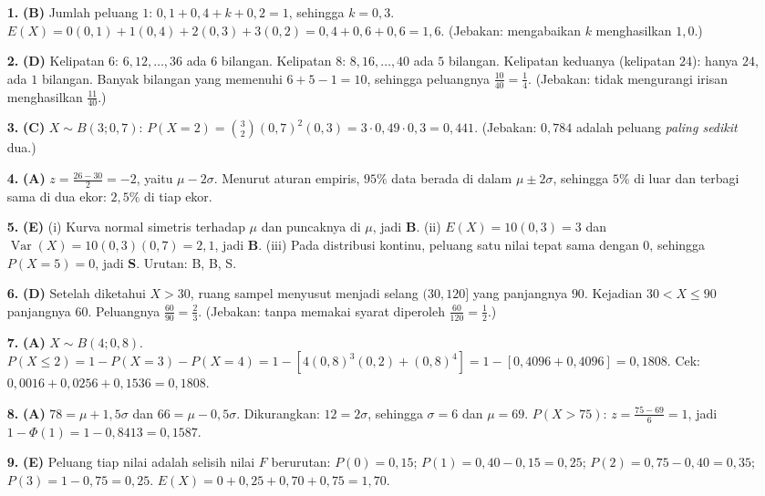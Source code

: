 \documentclass[a4paper,11pt]{article}
\newcounter{no}
\newcommand{\Var}{\operatorname{Var}}
\begin{document}
\small\begin{enumerate}[leftmargin=2em,itemsep=2pt,topsep=2pt]
\item[\textbf{1.}] \textbf{(B)} Jumlah peluang $1$: $0{,}1+0{,}4+k+0{,}2=1$, sehingga $k=0{,}3$. $E(X)=0(0{,}1)+1(0{,}4)+2(0{,}3)+3(0{,}2)=0{,}4+0{,}6+0{,}6=1{,}6$. (Jebakan: mengabaikan $k$ menghasilkan $1{,}0$.)
\item[\textbf{2.}] \textbf{(D)} Kelipatan $6$: $6,12,\dots,36$ ada $6$ bilangan. Kelipatan $8$: $8,16,\dots,40$ ada $5$ bilangan. Kelipatan keduanya (kelipatan $24$): hanya $24$, ada $1$ bilangan. Banyak bilangan yang memenuhi $6+5-1=10$, sehingga peluangnya $\frac{10}{40}=\frac14$. (Jebakan: tidak mengurangi irisan menghasilkan $\frac{11}{40}$.)
\item[\textbf{3.}] \textbf{(C)} $X\sim B(3;0{,}7)$: $P(X=2)=\binom32(0{,}7)^2(0{,}3)=3\cdot0{,}49\cdot0{,}3=0{,}441$. (Jebakan: $0{,}784$ adalah peluang \emph{paling sedikit} dua.)
\item[\textbf{4.}] \textbf{(A)} $z=\frac{26-30}{2}=-2$, yaitu $\mu-2\sigma$. Menurut aturan empiris, $95\%$ data berada di dalam $\mu\pm2\sigma$, sehingga $5\%$ di luar dan terbagi sama di dua ekor: $2{,}5\%$ di tiap ekor.
\item[\textbf{5.}] \textbf{(E)} (i) Kurva normal simetris terhadap $\mu$ dan puncaknya di $\mu$, jadi \textbf{B}. (ii) $E(X)=10(0{,}3)=3$ dan $\Var(X)=10(0{,}3)(0{,}7)=2{,}1$, jadi \textbf{B}. (iii) Pada distribusi kontinu, peluang satu nilai tepat sama dengan $0$, sehingga $P(X=5)=0$, jadi \textbf{S}. Urutan: B, B, S.
\item[\textbf{6.}] \textbf{(D)} Setelah diketahui $X>30$, ruang sampel menyusut menjadi selang $(30,120]$ yang panjangnya $90$. Kejadian $30<X\le90$ panjangnya $60$. Peluangnya $\frac{60}{90}=\frac23$. (Jebakan: tanpa memakai syarat diperoleh $\frac{60}{120}=\frac12$.)
\item[\textbf{7.}] \textbf{(A)} $X\sim B(4;0{,}8)$. $P(X\le2)=1-P(X=3)-P(X=4)=1-\left[4(0{,}8)^3(0{,}2)+(0{,}8)^4\right]=1-[0{,}4096+0{,}4096]=0{,}1808$. Cek: $0{,}0016+0{,}0256+0{,}1536=0{,}1808$.
\item[\textbf{8.}] \textbf{(A)} $78=\mu+1{,}5\sigma$ dan $66=\mu-0{,}5\sigma$. Dikurangkan: $12=2\sigma$, sehingga $\sigma=6$ dan $\mu=69$. $P(X>75)$: $z=\frac{75-69}{6}=1$, jadi $1-\Phi(1)=1-0{,}8413=0{,}1587$.
\item[\textbf{9.}] \textbf{(E)} Peluang tiap nilai adalah selisih nilai $F$ berurutan: $P(0)=0{,}15$; $P(1)=0{,}40-0{,}15=0{,}25$; $P(2)=0{,}75-0{,}40=0{,}35$; $P(3)=1-0{,}75=0{,}25$. $E(X)=0+0{,}25+0{,}70+0{,}75=1{,}70$.

\end{enumerate}
\end{document}
